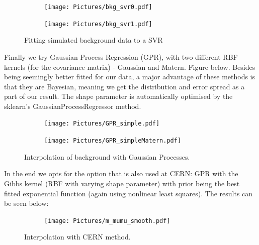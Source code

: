 \documentclass{article}
\begin{document}
\begin{figure}[H]
\centering
\begin{subfigure}{.48\textwidth}
\texttt{[image: Pictures/bkg\_svr0.pdf]}
\end{subfigure}
\begin{subfigure}{.48\textwidth}
\texttt{[image: Pictures/bkg\_svr1.pdf]}
\end{subfigure}
\caption*{Fitting simulated background data to a SVR}
\end{figure}

Finally we try Gaussian Process Regression (GPR), with two different RBF kernels (for the covariance matrix) - Gaussian and Matern. Figure below. Besides being seemingly better fitted for our data, a major advantage of these methods is that they are Bayesian, meaning we get the distribution and error spread as a part of our result. The shape parameter is automatically optimised by the sklearn's GaussianProcessRegressor method.

\begin{figure}[H]
\centering
\begin{subfigure}{.49\textwidth}
\texttt{[image: Pictures/GPR\_simple.pdf]}
\end{subfigure}
\begin{subfigure}{.49\textwidth}
\texttt{[image: Pictures/GPR\_simpleMatern.pdf]}
\end{subfigure}
\caption*{Interpolation of background with Gaussian Processes.}
\label{fig:bkgGPR}
\end{figure}

In the end we opts for the option that is also used at CERN: GPR with the Gibbs kernel (RBF with varying shape parameter) with prior being the best fitted exponential function (again using nonlinear least squares). The results can be seen below:

\begin{figure}[H]
\centering
\begin{subfigure}{.49\textwidth}
\texttt{[image: Pictures/m\_mumu\_smooth.pdf]}
\end{subfigure}
\caption*{Interpolation with CERN method.}
\label{fig:bkgBest}
\end{figure}
\end{document}
